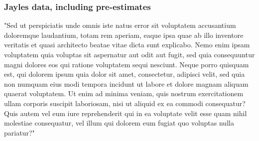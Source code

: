 \documentclass[9pt,twoside,lineno]{pnas-new}
\begin{document}
\subsubsection{Jayles data, including pre-estimates}
 

"Sed ut perspiciatis unde omnis iste natus error sit voluptatem accusantium doloremque laudantium, totam rem aperiam, eaque ipsa quae ab illo inventore veritatis et quasi architecto beatae vitae dicta sunt explicabo. Nemo enim ipsam voluptatem quia voluptas sit aspernatur aut odit aut fugit, sed quia consequuntur magni dolores eos qui ratione voluptatem sequi nesciunt. Neque porro quisquam est, qui dolorem ipsum quia dolor sit amet, consectetur, adipisci velit, sed quia non numquam eius modi tempora incidunt ut labore et dolore magnam aliquam quaerat voluptatem. Ut enim ad minima veniam, quis nostrum exercitationem ullam corporis suscipit laboriosam, nisi ut aliquid ex ea commodi consequatur? Quis autem vel eum iure reprehenderit qui in ea voluptate velit esse quam nihil molestiae consequatur, vel illum qui dolorem eum fugiat quo voluptas nulla pariatur?"
\end{document}
